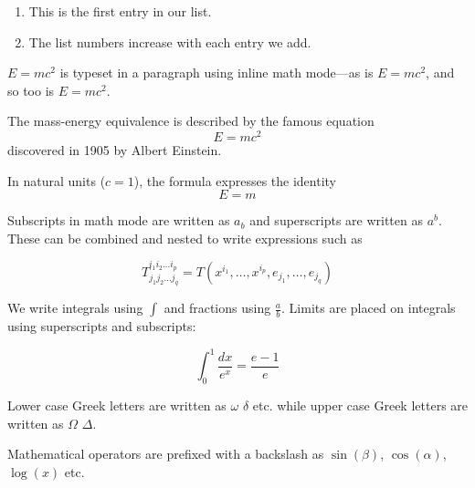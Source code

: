 \documentclass[12pt, a4paper]{article} %
\begin{document}
    \begin{enumerate}                                      %
        \item This is the first entry in our list.
        \item The list numbers increase with each entry we add.
    \end{enumerate}

    \begin{math}                                           %
        E=mc^2
    \end{math} is typeset in a paragraph using inline math mode---as is $E=mc^2$, and so too is \(E=mc^2\).

    The mass-energy equivalence is described by the famous equation
    \[ E=mc^2 \] discovered in 1905 by Albert Einstein.

    In natural units ($c = 1$), the formula expresses the identity
    \begin{equation}
        E=m
    \end{equation}

    Subscripts in math mode are written as $a_b$ and superscripts are written as $a^b$. These can be combined and nested to write expressions such as

    \[ T^{i_1 i_2 \dots i_p}_{j_1 j_2 \dots j_q} = T(x^{i_1},\dots,x^{i_p},e_{j_1},\dots,e_{j_q}) \]

    We write integrals using $\int$ and fractions using $\frac{a}{b}$. Limits are placed on integrals using superscripts and subscripts:

    \[ \int_0^1 \frac{dx}{e^x} =  \frac{e-1}{e} \]

    Lower case Greek letters are written as $\omega$ $\delta$ etc. while upper case Greek letters are written as $\Omega$ $\Delta$.

    Mathematical operators are prefixed with a backslash as $\sin(\beta)$, $\cos(\alpha)$, $\log(x)$ etc.
\end{document}
